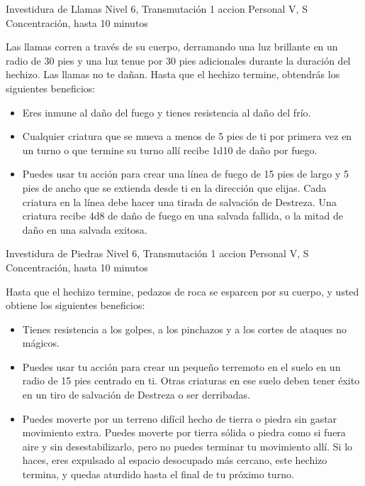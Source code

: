 \documentclass[a4paper,twocolumn,openany,10pt]{dndbook}
\begin{document}
\spellheader%
	{Investidura de Llamas}
	{Nivel 6, Transmutación}
	{1 accion}
	{Personal}
	{V, S}
	{Concentración, hasta 10 minutos}
	
	Las llamas corren a través de su cuerpo, derramando una luz brillante en un radio de 30 pies y una luz tenue por 30 pies
	adicionales durante la duración del hechizo. Las llamas no te dañan. Hasta que el hechizo termine, obtendrás los siguientes
	beneficios:
	\begin{itemize}
		\item Eres inmune al daño del fuego y tienes resistencia al daño del frío.
		
		\item Cualquier criatura que se mueva a menos de 5 pies de ti por primera vez en un turno o que termine su turno allí
		recibe 1d10 de daño por fuego.
		
		\item Puedes usar tu acción para crear una línea de fuego de 15 pies de largo y 5 pies de ancho que se extienda desde ti
		en la dirección que elijas. Cada criatura en la línea debe hacer una tirada de salvación de Destreza. Una criatura
		recibe 4d8 de daño de fuego en una salvada fallida, o la mitad de daño en una salvada exitosa. 
	\end{itemize}

\spellheader%
	{Investidura de Piedras}
	{Nivel 6, Transmutación}
	{1 accion}
	{Personal}
	{V, S}
	{Concentración, hasta 10 minutos}
	
	Hasta que el hechizo termine, pedazos de roca se esparcen por su cuerpo, y usted obtiene los siguientes beneficios:
	\begin{itemize}
		\item Tienes resistencia a los golpes, a los pinchazos y a los cortes de ataques no mágicos. 
		
		\item Puedes usar tu acción para crear un pequeño terremoto en el suelo en un radio de 15 pies centrado en ti. Otras
		criaturas en ese suelo deben tener éxito en un tiro de salvación de Destreza o ser derribadas.
		
		\item Puedes moverte por un terreno difícil hecho de tierra o piedra sin gastar movimiento extra. Puedes moverte por
		tierra sólida o piedra como si fuera aire y sin desestabilizarlo, pero no puedes terminar tu movimiento allí. Si lo
		haces, eres expulsado al espacio desocupado más cercano, este hechizo termina, y quedas aturdido hasta el final de tu
		próximo turno. 
	\end{itemize}
\end{document}
